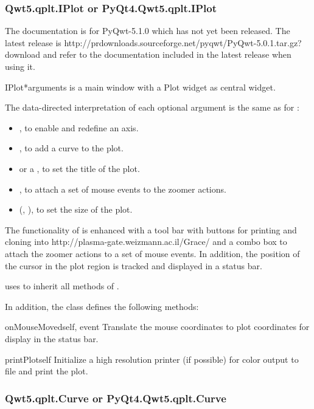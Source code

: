 \documentclass{manual}
\newcommand{\Grace}{\ulink{Grace}
  {http://plasma-gate.weizmann.ac.il/Grace/}}
\newcommand{\PyQwtLatestTarGz}{\ulink{PyQwt-5.0.1.tar.gz}
  {http://prdownloads.sourceforge.net/pyqwt/PyQwt-5.0.1.tar.gz?download}}
\newcommand{\Future}{
  \begin{notice}[warning]
    The documentation is for PyQwt-5.1.0 which has not yet been released. The
    latest release is \PyQwtLatestTarGz{} and refer to the documentation
    included in the latest release when using it.
  \end{notice}
}
\begin{document}
\subsubsection{Qwt5.qplt.IPlot or PyQt4.Qwt5.qplt.IPlot \label{intro-qplt-iplot}}

\Future{}

\begin{classdesc}{IPlot}{*arguments}
   is a main window with a Plot widget as central widget.

  The data-directed interpretation of each optional argument is the
  same as for :
  \begin{itemize}
  \item
    , to enable and redefine an axis.
  \item
    , to add a curve to the plot.
  \item
     or a , to set the title of the plot.
  \item
    , to attach a set of mouse events to the zoomer actions.
  \item
    (, ), to set the size of the plot.
  \end{itemize}

  The functionality of  is enhanced with a tool bar with
  buttons for printing and cloning into \Grace{} and a combo box to attach
  the zoomer actions to a set of mouse events.
  In addition, the position of the cursor in the plot region is tracked
  and displayed in a status bar. 

   uses  to inherit all methods of
  .


In addition, the class  defines the following methods:

\begin{methoddesc}[Plot]{onMouseMoved}{self, event}
Translate the mouse coordinates to plot coordinates for display in the status
bar.
\end{methoddesc}

\begin{methoddesc}[IPlot]{printPlot}{self}
Initialize a high resolution printer (if possible) for color output to file and
print the plot.
\end{methoddesc}

\end{classdesc}

\subsubsection{Qwt5.qplt.Curve or PyQt4.Qwt5.qplt.Curve \label{intro-qplt-curve}}
\end{document}
